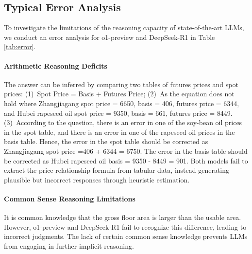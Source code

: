\subsection{Typical Error Analysis}
To investigate the limitations of the reasoning capacity of state-of-the-art LLMs, we conduct an error analysis for o1-preview and DeepSeek-R1 in Table \ref{tab:error}.
\paragraph{Arithmetic Reasoning Deficits}
The answer can be inferred by comparing two tables of futures prices and spot prices: (1)~Spot Price = Basis + Futures Price; 
(2)~As the equation does not hold where 
Zhangjiagang spot price = 6650, basis = 406, futures price = 6344,
and Hubei rapeseed oil spot price = 9350, basis = 661, futures price = 8449.
(3)~According to the question, there is an error in one of the soy-bean oil prices in the spot table, and there is an error in one of the rapeseed oil prices in the basis table.
Hence, the error in the spot table should be corrected as Zhangjiagang spot price =406 + 6344 = 6750.
The error in the basis table should be corrected as Hubei rapeseed oil basis = 9350 - 8449 = 901.  
Both models fail to extract the price relationship formula from tabular data, instead generating plausible but incorrect responses through heuristic estimation.
\paragraph{Common Sense Reasoning Limitations}
It is common knowledge that the gross floor area is larger than the usable area.
However, o1-preview and DeepSeek-R1 fail to recognize this difference, leading to incorrect judgments.
The lack of certain common sense knowledge prevents LLMs from engaging in further implicit reasoning.

